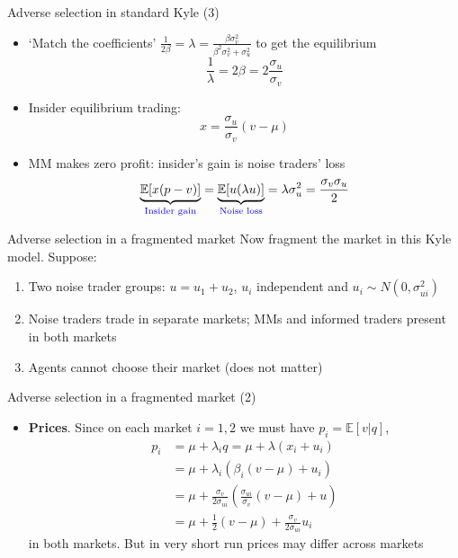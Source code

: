 \documentclass[english,10pt
,aspectratio=169
]{beamer}
\begin{document}
\begin{frame}{Adverse selection in standard Kyle (3)}
	\begin{itemize}
		\item `Match the coefficients' $\frac{1}{2\beta} = \lambda = \frac{\beta \sigma^{2}_{v}}{\beta^{2} \sigma^{2}_{v}+\sigma^{2}_{u}}$ to get the equilibrium
		\[
		\frac{1}{\lambda} = 2 \beta = 2 \frac{\sigma_{u}}{\sigma_{v}}
		\]
		\item Insider equilibrium trading:
		\[
		x = \frac{\sigma_{u}}{\sigma_{v}} (v-\mu)
		\]
		\item MM makes zero profit:  insider's gain is noise traders' loss
		\[
		\underbrace{\mathbb{E}[x(p-v)]}_{\textcolor{blue}{\text{Insider gain}}} = \underbrace{\mathbb{E}[u(\lambda u)]}_{\textcolor{blue}{\text{Noise loss}}} = \lambda \sigma^{2}_{u} = \frac{\sigma_{v}\sigma_{u}}{2}
		\]
	\end{itemize}
\end{frame}


\begin{frame}{Adverse selection in a fragmented market}
	Now fragment the market in this Kyle model. Suppose:
	\begin{enumerate}
		\item Two noise trader groups: $u=u_{1}+u_{2}$, $u_i$ independent and $u_{i} \sim N(0, \sigma^{2}_{ui})$
		\item Noise traders trade in separate markets; MMs and informed traders present in both markets
		\item Agents cannot choose their market (does not matter)
	\end{enumerate}
\end{frame}


\begin{frame}{Adverse selection in a fragmented market (2)}
	\begin{itemize}
		\item \textbf{Prices}.  Since on each market $i=1,2$ we must have $p_i=\mathbb{E}[v|q]$,
			\begin{align*}
				p_i &= \mu + \lambda_i q = \mu + \lambda (x_i + u_i)
				\\
				&= \mu + \lambda_i (\beta_i(v-\mu) + u_i)
				\\
				&= \mu + \frac{\sigma_v}{2 \sigma_{ui}} \left( \frac{\sigma_{ui}}{\sigma_v} (v-\mu) + u \right)
				\\
				&= \mu + \frac{1}{2}(v-\mu)+\frac{\sigma_v}{2\sigma_{ui}}u_i
			\end{align*}
		 in both markets. But in very short run prices may differ across markets
	\end{itemize}
\end{frame}
\end{document}
